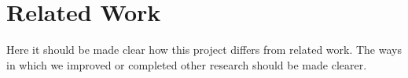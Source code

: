 \section{Related Work}
\label{sec:relwork}
Here it should be made clear how this project differs from related work.
The ways in which we improved or completed other research should be made clearer.